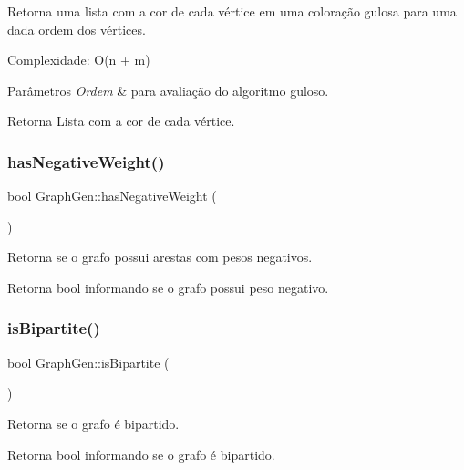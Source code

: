 Retorna uma lista com a cor de cada vértice em uma coloração gulosa para uma dada ordem dos vértices.

Complexidade\+: O(n + m) 
\begin{DoxyParams}{Parâmetros}
{\em Ordem} & para avaliação do algoritmo guloso. \\
\hline
\end{DoxyParams}
\begin{DoxyReturn}{Retorna}
Lista com a cor de cada vértice. 
\end{DoxyReturn}
\mbox{\label{classGraphGen_a904cd0ab02e4c837ebd85226996fb4b2}} 
\subsubsection{\texorpdfstring{hasNegativeWeight()}{hasNegativeWeight()}}
{\footnotesize\ttfamily bool Graph\+Gen\+::has\+Negative\+Weight (\begin{DoxyParamCaption}{ }\end{DoxyParamCaption})}

Retorna se o grafo possui arestas com pesos negativos. \begin{DoxyReturn}{Retorna}
bool informando se o grafo possui peso negativo. 
\end{DoxyReturn}
\mbox{\label{classGraphGen_a41afdf97face9260e82749c4c770b2e7}} 
\subsubsection{\texorpdfstring{isBipartite()}{isBipartite()}}
{\footnotesize\ttfamily bool Graph\+Gen\+::is\+Bipartite (\begin{DoxyParamCaption}{ }\end{DoxyParamCaption})}

Retorna se o grafo é bipartido. \begin{DoxyReturn}{Retorna}
bool informando se o grafo é bipartido. 
\end{DoxyReturn}
\mbox{\label{classGraphGen_aac3e93061f340c6855aa54ed73922f47}} 
